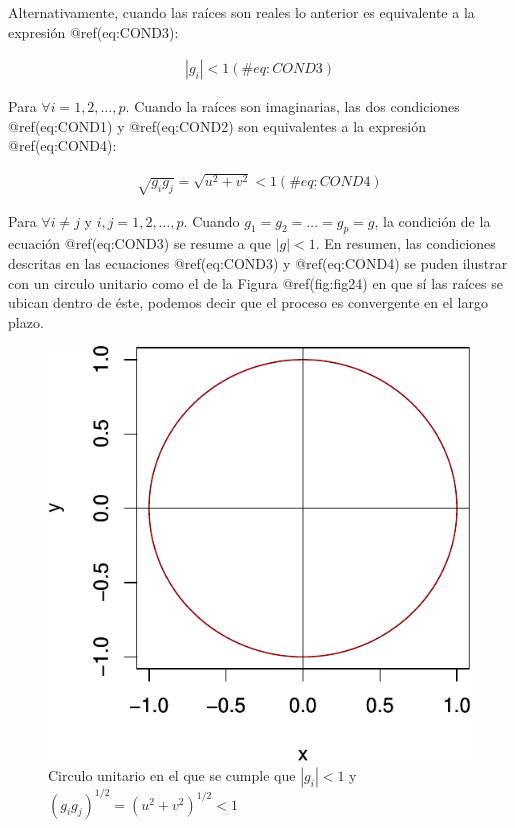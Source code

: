 \documentclass[
  a4paper,
]{article}
\begin{document}
Alternativamente, cuando las raíces son reales lo anterior es
equivalente a la expresión @ref(eq:COND3):

\begin{eqnarray}
    |g_i| < 1
    (\#eq:COND3)
\end{eqnarray}

Para \(\forall i = 1, 2, \ldots, p\). Cuando la raíces son imaginarias,
las dos condiciones @ref(eq:COND1) y @ref(eq:COND2) son equivalentes a
la expresión @ref(eq:COND4):

\begin{eqnarray}
    \sqrt{g_i g_j} = \sqrt{u^2 + v^2} < 1 
    (\#eq:COND4)
\end{eqnarray}

Para \(\forall i \neq j\) y \(i, j = 1, 2, \ldots, p\). Cuando
\(g_1 = g_2 = \ldots = g_p = g\), la condición de la ecuación
@ref(eq:COND3) se resume a que \(|g| < 1\). En resumen, las condiciones
descritas en las ecuaciones @ref(eq:COND3) y @ref(eq:COND4) se puden
ilustrar con un circulo unitario como el de la Figura @ref(fig:fig24) en
que sí las raíces se ubican dentro de éste, podemos decir que el proceso
es convergente en el largo plazo.

\begin{figure}

\caption{Circulo unitario en el que se cumple que \(|g_i|<1\) y
\((g_i g_j)^{1/2} = (u^2 + v^2)^{1/2} < 1\)}

{\centering \includegraphics{index_files/figure-pdf/fig24-1.pdf}

}

\end{figure}
\end{document}
